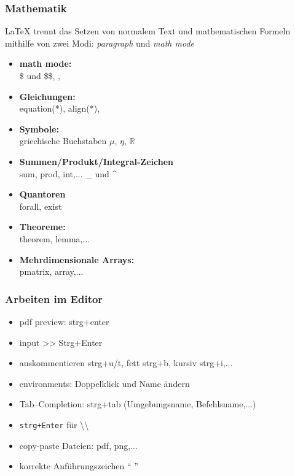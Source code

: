 \subsubsection{Mathematik}
LaTeX trennt das Setzen von normalem Text und mathematischen Formeln mithilfe von zwei Modi: \textit{paragraph} und \textit{math mode}
\begin{itemize}
	\item \textbf{math mode:}\\
	\$ und \$\$, \latexCommands{[}, \latexCommands{]}
	\item \textbf{Gleichungen:} \\
	equation(*), align(*),
	\item \textbf{Symbole:} \\
	griechische Buchstaben $\mu$, $\eta$, $\mathbb{R}$
	\item \textbf{Summen/Produkt/Integral-Zeichen}\\
	sum, prod, int,... \_ und \^{}
	\item \textbf{Quantoren}\\
	forall, exist
	\item \textbf{Theoreme:} \\
	theorem, lemma,...
	\item \textbf{Mehrdimensionale Arrays:}\\
	pmatrix, array,...
\end{itemize}


\subsubsection{Arbeiten im Editor}
\begin{itemize}
	\item pdf preview: strg+enter
	\item input >> Strg+Enter
	\item {} auskommentieren strg+u/t, fett strg+b, kursiv strg+i,...
	\item environments: Doppelklick und Name ändern
	\item Tab--Completion: strg+tab (Umgebungsname, Befehlsname,...)
	\item \texttt{strg+Enter} für \textbackslash\textbackslash
	\item copy-paste Dateien: pdf, png,...
	\item korrekte Anführungszeichen `` ''
\end{itemize}


